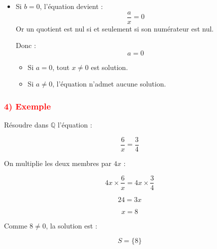 \documentclass[12pt,a4paper]{article}
\begin{document}
\begin{itemize}
    \item Si $b = 0$, l’équation devient :
    \[
    \frac{a}{x} = 0
    \]
    Or un quotient est nul si et seulement si son numérateur est nul.
    
    Donc :
    \[
    a = 0
    \]
    
    \begin{itemize}
        \item Si $a = 0$, tout $x \neq 0$ est solution.
        \item Si $a \neq 0$, l’équation n’admet aucune solution.
    \end{itemize}
\end{itemize}

\vspace{0.5cm}

\subsubsection*{\textcolor{red}{4) Exemple}}

Résoudre dans $\mathbb{Q}$ l’équation :

\[
\frac{6}{x} = \frac{3}{4}
\]

On multiplie les deux membres par $4x$ :

\[
4x \times \frac{6}{x} = 4x \times \frac{3}{4}
\]

\[
24 = 3x
\]

\[
x = 8
\]

Comme $8 \neq 0$, la solution est :

\[
S = \{8\}
\]
\end{document}
